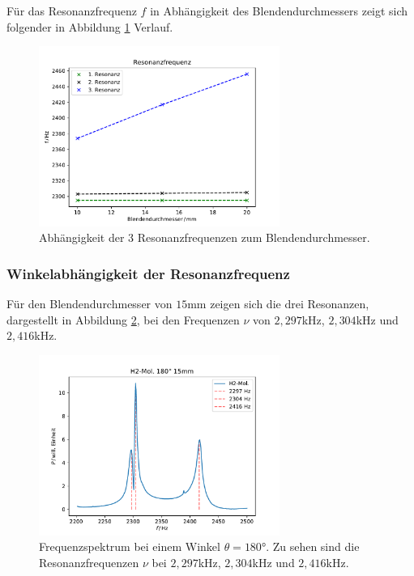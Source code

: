 Für das Resonanzfrequenz $f$ in Abhängigkeit des Blendendurchmessers zeigt sich folgender in Abbildung \ref{fig:blende_mol}
Verlauf.
\begin{figure}[H]
    \center
    \includegraphics[width=0.7\textwidth]{plots/Hatom/res_blende.pdf}
    \caption{Abhängigkeit der 3 Resonanzfrequenzen zum Blendendurchmesser.}
    \label{fig:blende_mol}
\end{figure}

\subsubsection*{Winkelabhängigkeit der Resonanzfrequenz}
Für den Blendendurchmesser von $15$mm zeigen sich die drei Resonanzen, dargestellt in Abbildung \ref{fig:blende_16_res},
bei den Frequenzen $\nu$ von $2,297$kHz, $2,304$kHz und $2,416$kHz.
\begin{figure}[H]
    \center
    \includegraphics[width=0.7\textwidth]{plots/Hatom/zustandsaufspaltung_mol15.pdf}
    \caption{Frequenzspektrum bei einem Winkel $\theta=180°$. Zu sehen sind die Resonanzfrequenzen $\nu$ bei $2,297$kHz, $2,304$kHz und $2,416$kHz.}
    \label{fig:blende_16_res}
\end{figure}

